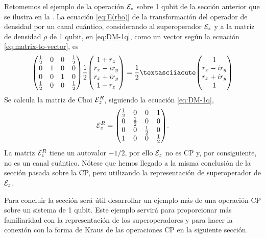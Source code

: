 Retomemos el ejemplo de la operación $\mathcal{E}_z$ sobre 1 qubit de la sección anterior
que se ilustra en la . La ecuación \eqref{eq:E(rho)}
de la transformación del operador de densidad por un canal cuántico, 
considerando al superoperador $\mathcal{E}_z$ y a la matriz de densidad 
$\rho$ de 1 qubit, en \eqref{eq:DM-1q}, como un vector según la ecuación 
\eqref{eq:matrix-to-vector}, es 
\begin{align}
\mqty(
\frac{1}{2} & 0 & 0 & \frac{1}{2} \\
0 & 1 & 0 & 0 \\
0 & 0 & 1 & 0 \\
\frac{1}{2} & 0 & 0 & \frac{1}{2} \\
)
\frac{1}{2}
\mqty(
1+r_z\\r_x-ir_y\\r_x+ir_y\\1-r_z
)
=
\frac{1}{2}´
\mqty(
1\\r_x-ir_y\\r_x+ir_y\\1
)
\end{align}
Se calcula la matriz de Choi $\mathcal{E}_z^{R}$, siguiendo la ecuación
\eqref{eq:DM-1q},
\begin{align}
\E_z^R=
\mqty(
\frac{1}{2} & 0 & 0 & 1 \\
0 & \frac{1}{2} & 0 & 0 \\
0 & 0 & \frac{1}{2} & 0 \\
1 & 0 & 0 & \frac{1}{2} 
).
\end{align}
La matriz $\mathcal{E}_z^R$ tiene un autovalor $-1/2$, por ello $\mathcal{E}_z$ no es CP y,
por consiguiente, no es un canal cuántico. Nótese que hemos llegado a la misma 
conclusión de la sección pasada sobre la CP, pero utilizando la representación 
de superoperador de $\mathcal{E}_z$.


Para concluir la sección será útil desarrollar un ejemplo más 
de una operación CP sobre un sistema de 1 qubit. Este 
ejemplo servirá para proporcionar más familiaridad con la representación de 
los superoperadores y para hacer la conexión con 
la forma de Kraus de las operaciones CP en la siguiente sección.

